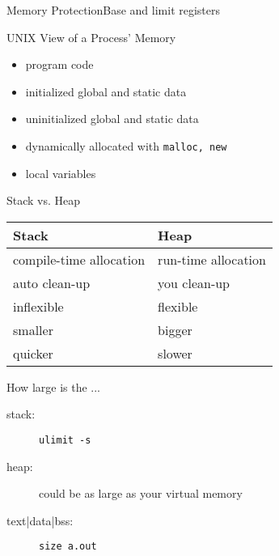 \begin{frame}{Memory Protection}{Base and limit registers}
  \begin{center}
  \end{center}
\end{frame}

\begin{frame}{UNIX View of a Process' Memory}
  \begin{varwidth}{.48\textwidth}
    \begin{center}
    \end{center}
  \end{varwidth}\hfill
  \begin{varwidth}{.48\textwidth}
    \begin{itemize}
    \item[text:] program code
    \item[data:] initialized global and static data
    \item[bss:] uninitialized global and static data
    \item[heap:] dynamically allocated with \texttt{malloc, new}
    \item[stack:] local variables
    \end{itemize}
  \end{varwidth}
\end{frame}

\begin{frame}{Stack vs. Heap}
  \begin{center}
    \begin{tabular}{ll}\toprule
      \textbf{Stack}           &\textbf{Heap}\\\midrule
      compile-time allocation &run-time allocation\\
      auto clean-up           &you clean-up\\
      inflexible              &flexible\\
      smaller                 &bigger\\
      quicker                 &slower\\\bottomrule
    \end{tabular}
  \end{center}
  \begin{block}{How large is the ...}
    \begin{description}
    \item[stack:] \texttt{ulimit -s}
    \item[heap:] could be as large as your virtual memory
    \item[text|data|bss:] \texttt{size a.out}
    \end{description}
  \end{block}
\end{frame}

